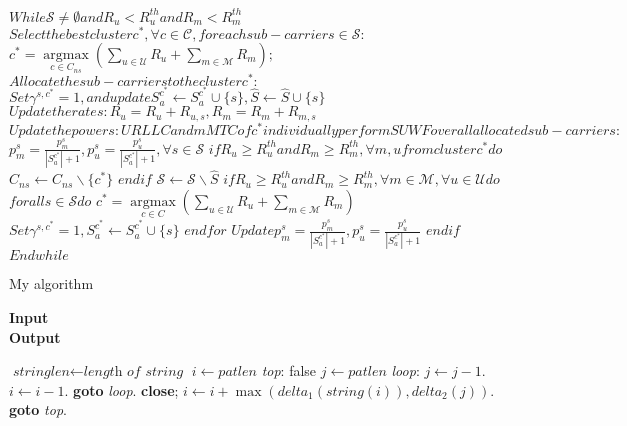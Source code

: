 $While {\mathcal{ S}} \ne \emptyset and {R_{u}} < R_{u}^{th} and {R_{m}} < R_{m}^{th}$
$Select the best cluster c^{*} , \forall c \in \mathcal {C} , for each sub-carrier s \in \mathcal {S} :$
${c^{*}} = \mathop {\arg \max }\limits _{c \in {C_{ns}}} \left ({{\sum \nolimits _{u \in \mathcal {U}} {R_{u} + \sum \nolimits _{m \in \mathcal {M}} {R_{m}} } } }\right) ;$
$Allocate the sub-carrier s to the cluster c^{*} :$
$Set {\gamma ^{s,{c^{*}}}} = 1 , and update S_{a}^{c^{*}} \leftarrow S_{a}^{c^{*}} \cup \{ s\} , \hat S \leftarrow \hat S \cup \{ s\}$
$Update the rates: {R_{u}} = {R_{u}} + {R_{u,s}} , {R_{m}} = {R_{m}} + {R_{m,s}}$
$Update the powers: URLLC and mMTC of c^{*} individually perform SUWF over all allocated sub-carriers:$
$p_{m}^{s} = \frac {p_{m}^{s}}{{\left |{ {S_{a}^{c^{*}}} }\right | + 1}} , p_{u}^{s} = \frac {p_{u}^{s}}{{\left |{ {S_{a}^{c^{*}}} }\right | + 1}} , \forall s \in \mathcal {S}$
$if {R_{u}} \geq R_{u}^{th} and {R_{m}} \geq R_{m}^{th} , \forall m,u from cluster c^{*} do$
${C_{ns}} \leftarrow {C_{ns}}\backslash \{{c^{*}}\}$
$end if$
$\mathcal {S} \leftarrow \mathcal {S}\backslash \hat S$
$if {R_{u}} \geq R_{u}^{th} and {R_{m}} \geq R_{m}^{th} , \forall m \in \mathcal {M} , \forall u \in \mathcal {U} do$
$for all s \in \mathcal {S} do$
${c^{*}} = \mathop {\arg \max }\limits _{c \in {C}} \left ({{\sum \nolimits _{u \in \mathcal {U}} {R_{u} + \sum \nolimits _{m \in \mathcal {M}} {R_{m}} } } }\right)$
$Set {\gamma ^{s,{c^{*}}}} = 1 , S_{a}^{c^{*}} \leftarrow S_{a}^{c^{*}} \cup \{ s\}$
$end for$
$Update p_{m}^{s} = \frac {p_{m}^{s}}{{\left |{ {S_{a}^{c^{*}}} }\right | + 1}} , p_{u}^{s} = \frac {p_{u}^{s}}{{\left |{ {S_{a}^{c^{*}}} }\right | + 1}}$
$end if$
$End while$\\

\makeatletter
\def\algbackskip{\hskip-\ALG@thistlm}
\makeatother

\begin{algorithm}
    \caption{My algorithm}\label{euclid}
    \hspace*{\algorithmicindent} \textbf{Input} \\
    \hspace*{\algorithmicindent} \textbf{Output} 
    \begin{algorithmic}[1]
    \State $\textit{stringlen} \gets \textit{length of } \textit{string}$
    \State $i \gets \textit{patlen}$
    \BState \emph{top}:
     \Return false
    \EndIf
    \State $j \gets \textit{patlen}$
    \BState \emph{loop}:
    \State $j \gets j-1$.
    \State $i \gets i-1$.
    \State \textbf{goto} \emph{loop}.
    \State \textbf{close};
    \EndIf
    \State $i \gets i+\max(\textit{delta}_1(\textit{string}(i)),\textit{delta}_2(j))$.
    \State \textbf{goto} \emph{top}.
    \EndProcedure
    \end{algorithmic}
\end{algorithm}

